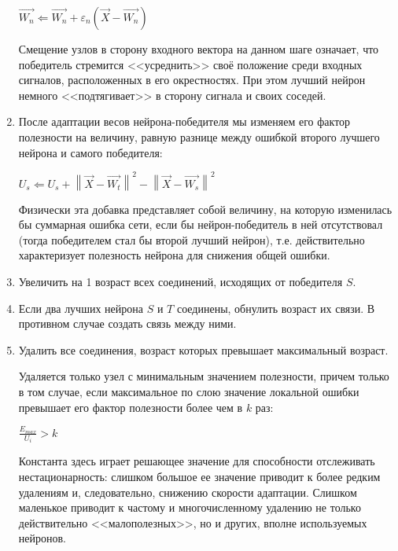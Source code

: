 \documentclass[unicode, 12pt, a4paper,oneside,fleqn]{article}
\begin{document}
\begin{enumerate}
  $\vec{W_n} \Leftarrow \vec{W_n}+\varepsilon_n(\vec{X}-\vec{W_n})$

  Смещение узлов в сторону входного вектора на данном шаге означает,
  что победитель стремится <<усреднить>> своё положение среди входных
  сигналов, расположенных в его окрестностях. При этом лучший нейрон
  немного <<подтягивает>> в сторону сигнала и своих соседей.

\item \label{gng-u:8} %
  После адаптации весов нейрона-победителя мы изменяем его фактор
  полезности на величину, равную разнице между ошибкой второго лучшего
  нейрона и самого победителя:

  $U_{s} \Leftarrow U_{s} + \left\|\vec{X}-\vec{W_t}\right\|^{2} -
                            \left\|\vec{X}-\vec{W_s}\right\|^{2}$

  Физически эта добавка представляет собой величину, на которую
  изменилась бы суммарная ошибка сети, если бы нейрон-победитель в ней
  отсутствовал (тогда победителем стал бы второй лучший нейрон),
  т.е. действительно характеризует полезность нейрона для снижения
  общей ошибки.

\item \label{gng-u:9} \label{gng:8}
  Увеличить на 1 возраст всех соединений, исходящих от победителя $S$.

\item \label{gng-u:10} \label{gng:9}
  Если два лучших нейрона $S$ и $T$ соединены, обнулить возраст их
  связи. В противном случае создать связь между ними.


\item \label{gng-u:11} %
  Удалить все соединения, возраст которых превышает максимальный
  возраст.

  Удаляется только узел с минимальным значением полезности, причем
  только в том случае, если максимальное по слою значение локальной
  ошибки превышает его фактор полезности более чем в $k$ раз:

  $\frac{E_{max}}{U_i} > k$

  Константа здесь играет решающее значение для способности отслеживать
  нестационарность: слишком большое ее значение приводит к более
  редким удалениям и, следовательно, снижению скорости
  адаптации. Слишком маленькое приводит к частому и многочисленному
  удалению не только действительно <<малополезных>>, но и других,
  вполне используемых нейронов.


\end{enumerate}
\end{document}
